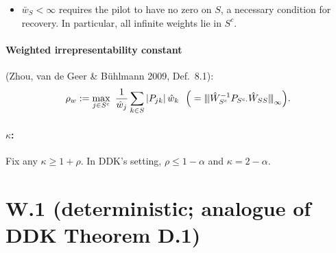 \documentclass[11pt,a4paper]{article}
\numberwithin{equation}{section}
\theoremstyle{plain}
\theoremstyle{remark}
\newcommand{\opnorm}[1]{{\vert\kern-0.25ex\vert\kern-0.25ex\vert #1 \vert\kern-0.25ex\vert\kern-0.25ex\vert}}
\begin{document}
\begin{itemize}
  \item $\bar w_S<\infty$ requires the pilot to have no zero on $S$, a necessary condition for recovery. In particular, all infinite weights lie in $S^c$.
 \end{itemize}

\paragraph{Weighted irrepresentability constant} (Zhou, van de Geer \& Bühlmann 2009, Def.~8.1):
\begin{equation}\label{eq:rhow}
\rho_w:=\max_{j\in S^c}\ \frac{1}{\hat w_j}\sum_{k\in S}|P_{jk}|\,\hat w_k\ \ \Big(=\opnorm{\hat W_{S^c}^{-1}P_{S^c\cdot}\hat W_{SS}}_\infty\Big).
\end{equation}

\paragraph{\textbf{$\kappa$:}} Fix any $\kappa\ge1+\rho$. In DDK's setting, $\rho\le1-\alpha$ and $\kappa=2-\alpha$.

\section{W.1 (deterministic; analogue of DDK Theorem D.1)}\label{sec:W1}
\end{document}
